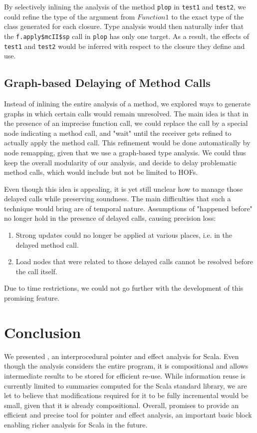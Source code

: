 By selectively inlining the analysis of the method \lstinline{plop} in
\lstinline{test1} and \lstinline{test2}, we could refine the type of the
argument from $Function1$ to the exact type of the class generated for each
closure. Type analysis would then naturally infer that the
\lstinline{f.apply$mcII$sp} call in \lstinline{plop} has only one target.  As a
result, the effects of \lstinline{test1} and \lstinline{test2} would be
inferred with respect to the closure they define and use.

\subsection{Graph-based Delaying of Method Calls}
Instead of inlining the entire analysis of a method, we explored ways to
generate graphs in which certain calls would remain unresolved. The main idea
is that in the presence of an imprecise function call, we could replace the
call by a special node indicating a method call, and "wait" until the receiver
gets refined to actually apply the method call. This refinement would be done
automatically by node remapping, given that we use a graph-based type analysis.
We could thus keep the overall modularity of our analysis, and decide to delay
problematic method calls, which would include but not be limited to HOFs.

Even though this idea is appealing, it is yet still unclear how to manage those
delayed calls while preserving soundness. The main difficulties that such a
technique would bring are of temporal nature. Assumptions of "happened before"
no longer hold in the presence of delayed calls, causing precision loss:
\begin{enumerate}
    \item Strong updates could no longer be applied at various places, i.e. in
    the delayed method call.
    \item Load nodes that were related to those delayed calls cannot be resolved
    before the call itself.
\end{enumerate}
Due to time restrictions, we could not go further with the development of this
promising feature.


\section{Conclusion}
We presented \insane, an interprocedural pointer and effect analysis for Scala.
Even though the analysis considers the entire program, it is compositional and
allows intermediate results to be stored for efficient re-use. While
information reuse is currently limited to summaries computed for the Scala
standard library, we are let to believe that modifications required for it to
be fully incremental would be small, given that it is already compositional.
Overall, {\insane} promises to provide an efficient and precise tool for
pointer and effect analysis, an important basic block enabling richer analysis
for Scala in the future.
